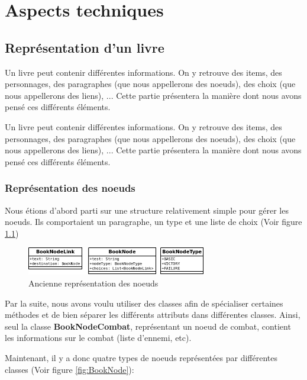 \chapter{Aspects techniques}

	\section{Représentation d'un livre}
		Un livre peut contenir différentes informations. On y retrouve des items, des personnages, des paragraphes (que nous appellerons des noeuds), des choix (que nous appellerons des liens), ... Cette partie présentera la manière dont nous avons pensé ces différents éléments.

		Un livre peut contenir différentes informations. On y retrouve des items, des personnages, des paragraphes (que nous appellerons des noeuds), des choix (que nous appellerons des liens), ... Cette partie présentera la manière dont nous avons pensé ces différents éléments.

		\subsection{Représentation des noeuds}

			Nous étions d'abord parti sur une structure relativement simple pour gérer les noeuds. Ils comportaient un paragraphe, un type et une liste de choix (Voir figure \ref{fig:OldBookNode})

			\begin{figure}[H]
				\centering\includegraphics[width=0.70\textwidth, keepaspectratio]{img/BookNodeBefore.png}
				\caption{Ancienne représentation des noeuds}
				\label{fig:OldBookNode}
			\end{figure}

			Par la suite, nous avons voulu utiliser des classes afin de spécialiser certaines méthodes et de bien séparer les différents attributs dans différentes classes. Ainsi, seul la classe \textbf{BookNodeCombat}, représentant un noeud de combat, contient les informations sur le combat (liste d'ennemi, etc).

			Maintenant, il y a donc quatre types de noeuds représentées par différentes classes (Voir figure \ref{fig:BookNode}):

